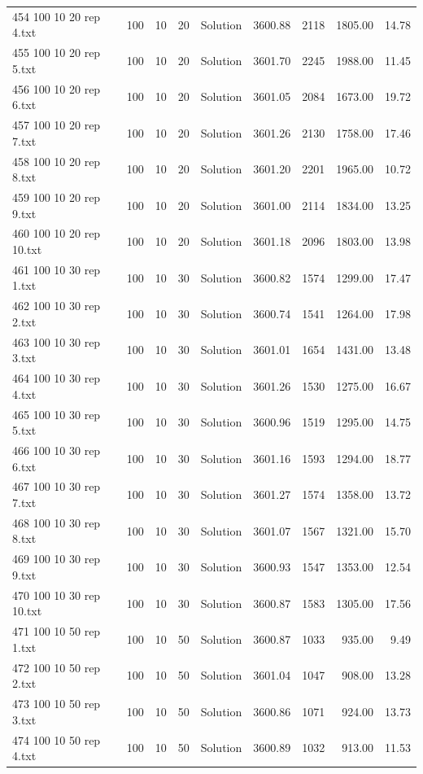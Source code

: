 \begin{longtable}{lrrllrrrr}
454 100 10 20 rep 4.txt & 100 & 10 & 20 & Solution & 3600.88 & 2118 & 1805.00 & 14.78\\
455 100 10 20 rep 5.txt & 100 & 10 & 20 & Solution & 3601.70 & 2245 & 1988.00 & 11.45\\
456 100 10 20 rep 6.txt & 100 & 10 & 20 & Solution & 3601.05 & 2084 & 1673.00 & 19.72\\
457 100 10 20 rep 7.txt & 100 & 10 & 20 & Solution & 3601.26 & 2130 & 1758.00 & 17.46\\
458 100 10 20 rep 8.txt & 100 & 10 & 20 & Solution & 3601.20 & 2201 & 1965.00 & 10.72\\
459 100 10 20 rep 9.txt & 100 & 10 & 20 & Solution & 3601.00 & 2114 & 1834.00 & 13.25\\
460 100 10 20 rep 10.txt & 100 & 10 & 20 & Solution & 3601.18 & 2096 & 1803.00 & 13.98\\
461 100 10 30 rep 1.txt & 100 & 10 & 30 & Solution & 3600.82 & 1574 & 1299.00 & 17.47\\
462 100 10 30 rep 2.txt & 100 & 10 & 30 & Solution & 3600.74 & 1541 & 1264.00 & 17.98\\
463 100 10 30 rep 3.txt & 100 & 10 & 30 & Solution & 3601.01 & 1654 & 1431.00 & 13.48\\
464 100 10 30 rep 4.txt & 100 & 10 & 30 & Solution & 3601.26 & 1530 & 1275.00 & 16.67\\
465 100 10 30 rep 5.txt & 100 & 10 & 30 & Solution & 3600.96 & 1519 & 1295.00 & 14.75\\
466 100 10 30 rep 6.txt & 100 & 10 & 30 & Solution & 3601.16 & 1593 & 1294.00 & 18.77\\
467 100 10 30 rep 7.txt & 100 & 10 & 30 & Solution & 3601.27 & 1574 & 1358.00 & 13.72\\
468 100 10 30 rep 8.txt & 100 & 10 & 30 & Solution & 3601.07 & 1567 & 1321.00 & 15.70\\
469 100 10 30 rep 9.txt & 100 & 10 & 30 & Solution & 3600.93 & 1547 & 1353.00 & 12.54\\
470 100 10 30 rep 10.txt & 100 & 10 & 30 & Solution & 3600.87 & 1583 & 1305.00 & 17.56\\
471 100 10 50 rep 1.txt & 100 & 10 & 50 & Solution & 3600.87 & 1033 & 935.00 &  9.49\\
472 100 10 50 rep 2.txt & 100 & 10 & 50 & Solution & 3601.04 & 1047 & 908.00 & 13.28\\
473 100 10 50 rep 3.txt & 100 & 10 & 50 & Solution & 3600.86 & 1071 & 924.00 & 13.73\\
474 100 10 50 rep 4.txt & 100 & 10 & 50 & Solution & 3600.89 & 1032 & 913.00 & 11.53\\

\end{longtable}
